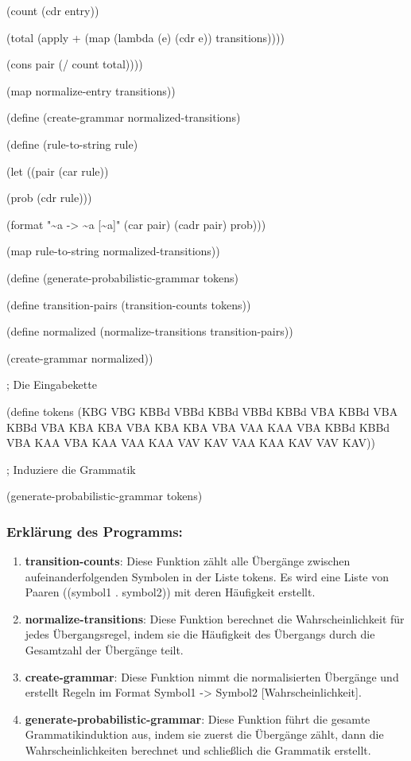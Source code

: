 \documentclass[
]{article}
\begin{document}
(count (cdr entry))

(total (apply + (map (lambda (e) (cdr e)) transitions))))

(cons pair (/ count total))))

(map normalize-entry transitions))

(define (create-grammar normalized-transitions)

(define (rule-to-string rule)

(let ((pair (car rule))

(prob (cdr rule)))

(format "\textasciitilde a -\textgreater{} \textasciitilde a
{[}\textasciitilde a{]}" (car pair) (cadr pair) prob)))

(map rule-to-string normalized-transitions))

(define (generate-probabilistic-grammar tokens)

(define transition-pairs (transition-counts tokens))

(define normalized (normalize-transitions transition-pairs))

(create-grammar normalized))

; Die Eingabekette

(define tokens \textquotesingle(KBG VBG KBBd VBBd KBBd VBBd KBBd VBA
KBBd VBA KBBd VBA KBA KBA VBA KBA KBA VBA VAA KAA VBA KBBd KBBd VBA KAA
VBA KAA VAA KAA VAV KAV VAA KAA KAV VAV KAV))

; Induziere die Grammatik

(generate-probabilistic-grammar tokens)

\subsubsection{\texorpdfstring{\textbf{Erklärung des
Programms:}}{Erklärung des Programms:}}\label{erkluxe4rung-des-programms}

\begin{enumerate}
\def\labelenumi{\arabic{enumi}.}
\item
  \textbf{transition-counts}: Diese Funktion zählt alle Übergänge
  zwischen aufeinanderfolgenden Symbolen in der Liste tokens. Es wird
  eine Liste von Paaren ((symbol1 . symbol2)) mit deren Häufigkeit
  erstellt.
\item
  \textbf{normalize-transitions}: Diese Funktion berechnet die
  Wahrscheinlichkeit für jedes Übergangsregel, indem sie die Häufigkeit
  des Übergangs durch die Gesamtzahl der Übergänge teilt.
\item
  \textbf{create-grammar}: Diese Funktion nimmt die normalisierten
  Übergänge und erstellt Regeln im Format Symbol1 -\textgreater{}
  Symbol2 {[}Wahrscheinlichkeit{]}.
\item
  \textbf{generate-probabilistic-grammar}: Diese Funktion führt die
  gesamte Grammatikinduktion aus, indem sie zuerst die Übergänge zählt,
  dann die Wahrscheinlichkeiten berechnet und schließlich die Grammatik
  erstellt.
\end{enumerate}
\end{document}
